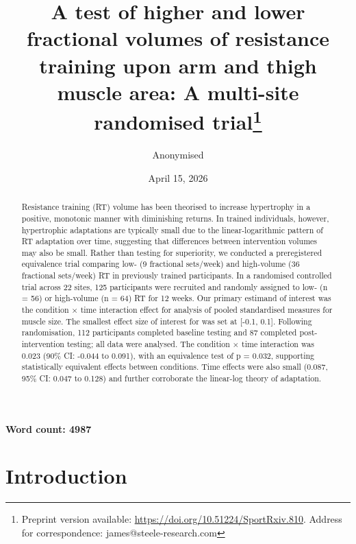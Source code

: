 \documentclass[
]{article}
\title{A test of higher and lower fractional volumes of resistance
training upon arm and thigh muscle area: A multi-site randomised
trial\thanks{Preprint version available:
\url{https://doi.org/10.51224/SportRxiv.810}. Address for
correspondence: james@steele-research.com}}
\author{Anonymised}
\date{April 15, 2026}
\begin{document}
\maketitle
\begin{abstract}
Resistance training (RT) volume has been theorised to increase
hypertrophy in a positive, monotonic manner with diminishing returns. In
trained individuals, however, hypertrophic adaptations are typically
small due to the linear-logarithmic pattern of RT adaptation over time,
suggesting that differences between intervention volumes may also be
small. Rather than testing for superiority, we conducted a preregistered
equivalence trial comparing low- (9 fractional sets/week) and
high-volume (36 fractional sets/week) RT in previously trained
participants. In a randomised controlled trial across 22 sites, 125
participants were recruited and randomly assigned to low- (n = 56) or
high-volume (n = 64) RT for 12 weeks. Our primary estimand of interest
was the condition × time interaction effect for analysis of pooled
standardised measures for muscle size. The smallest effect size of
interest for was set at {[}-0.1, 0.1{]}. Following randomisation, 112
participants completed baseline testing and 87 completed
post-intervention testing; all data were analysed. The condition × time
interaction was 0.023 (90\% CI: -0.044 to 0.091), with an equivalence
test of p = 0.032, supporting statistically equivalent effects between
conditions. Time effects were also small (0.087, 95\% CI: 0.047 to
0.128) and further corroborate the linear-log theory of adaptation.
\end{abstract}


\textbf{Word count: 4987}

\section{Introduction}\label{introduction}
\end{document}
